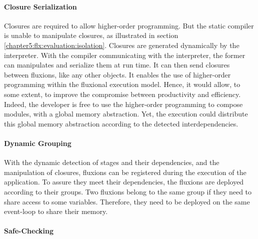 
\paragraph{Closure Serialization}

Closures are required to allow higher-order programming.
But the static compiler is unable to manipulate closures, as illustrated in section \ref{chapter5:flx:evaluation:isolation}.
Closures are generated dynamically by the interpreter.
With the compiler communicating with the interpreter, the former can manipulates and serialize them at run time.
It can then send closures between fluxions, like any other objects.
It enables the use of higher-order programming within the fluxional execution model.
Hence, it would allow, to some extent, to improve the compromise between productivity and efficiency.
Indeed, the developer is free to use the higher-order programming to compose modules, with a global memory abstraction.
Yet, the execution could distribute this global memory abstraction according to the detected interdependencies.

\paragraph{Dynamic Grouping}

With the dynamic detection of stages and their dependencies, and the manipulation of closures, fluxions can be registered during the execution of the application.
To assure they meet their dependencies, the fluxions are deployed according to their groups.
Two fluxions belong to the same group if they need to share access to some variables.
Therefore, they need to be deployed on the same event-loop to share their memory.

\paragraph{Safe-Checking}

